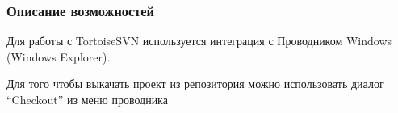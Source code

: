 \documentclass[a4paper,12pt]{article}
\begin{document}
\subsubsection{Описание возможностей}

Для работы с TortoiseSVN используется интеграция с Проводником Windows
(Windows Explorer).

Для того чтобы выкачать проект из репозитория можно использовать диалог
``Checkout'' из меню проводника

\begin{figure}[h!]
	\begin{minipage}[h]{0.24\linewidth}
	\end{minipage}
	\hfill
	\begin{minipage}[h]{0.75\linewidth}
	\end{minipage}
\end{figure}
\end{document}
